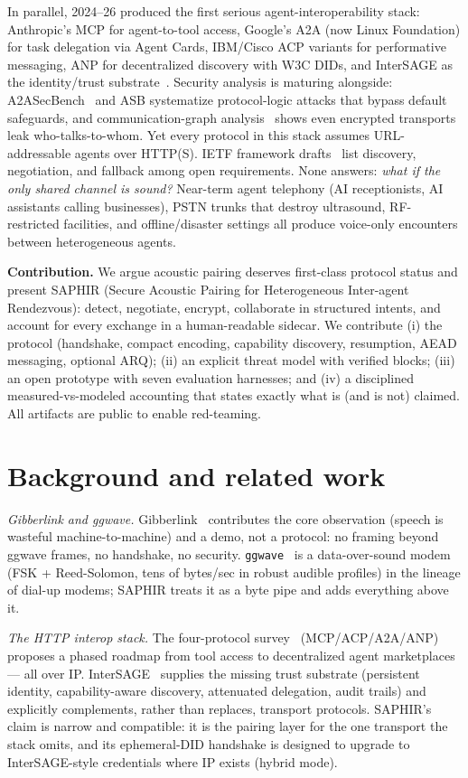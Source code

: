 \documentclass[11pt]{article}
\begin{document}
In parallel, 2024--26 produced the first serious agent-interoperability stack:
Anthropic's MCP for agent-to-tool access, Google's A2A (now Linux Foundation)
for task delegation via Agent Cards, IBM/Cisco ACP variants for performative
messaging, ANP for decentralized discovery with W3C DIDs, and InterSAGE as the
identity/trust substrate~\cite{interop-survey,intersage}. Security analysis is
maturing alongside: A2ASecBench~\cite{a2asecbench} and ASB systematize
protocol-logic attacks that bypass default safeguards, and communication-graph
analysis~\cite{graphmeta} shows even encrypted transports leak
who-talks-to-whom. Yet every protocol in this stack assumes URL-addressable
agents over HTTP(S). IETF framework drafts~\cite{ietf-agents} list discovery,
negotiation, and fallback among open requirements. None answers: \emph{what if
the only shared channel is sound?} Near-term agent telephony (AI receptionists,
AI assistants calling businesses), PSTN trunks that destroy ultrasound,
RF-restricted facilities, and offline/disaster settings all produce voice-only
encounters between heterogeneous agents.

\textbf{Contribution.} We argue acoustic pairing deserves first-class protocol
status and present SAPHIR (Secure Acoustic Pairing for Heterogeneous
Inter-agent Rendezvous): detect, negotiate, encrypt, collaborate in structured
intents, and account for every exchange in a human-readable sidecar. We
contribute (i) the protocol (handshake, compact encoding, capability
discovery, resumption, AEAD messaging, optional ARQ); (ii) an explicit threat model with verified blocks; (iii) an
open prototype with seven evaluation harnesses; and (iv) a disciplined
measured-vs-modeled accounting that states exactly what is (and is not)
claimed. All artifacts are public to enable red-teaming.

\section{Background and related work}
\emph{Gibberlink and ggwave.} Gibberlink~\cite{gibberlink} contributes the
core observation (speech is wasteful machine-to-machine) and a demo, not a
protocol: no framing beyond ggwave frames, no handshake, no security.
\texttt{ggwave}~\cite{ggwave} is a data-over-sound modem (FSK + Reed-Solomon,
tens of bytes/sec in robust audible profiles) in the lineage of dial-up
modems; SAPHIR treats it as a byte pipe and adds everything above it.

\emph{The HTTP interop stack.} The four-protocol survey~\cite{interop-survey}
(MCP/ACP/A2A/ANP) proposes a phased roadmap from tool access to decentralized
agent marketplaces --- all over IP. InterSAGE~\cite{intersage} supplies the
missing trust substrate (persistent identity, capability-aware discovery,
attenuated delegation, audit trails) and explicitly complements, rather than
replaces, transport protocols. SAPHIR's claim is narrow and compatible: it is
the pairing layer for the one transport the stack omits, and its ephemeral-DID
handshake is designed to upgrade to InterSAGE-style credentials where IP exists
(hybrid mode).
\end{document}

